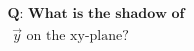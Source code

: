 \documentclass[preview]{standalone}
\begin{document}
\begin{align*}
\textbf{Q: What is the shadow of} \\ \,\, \vec{y} \,\, \text{on the xy-plane?}
\end{align*}
\end{document}
